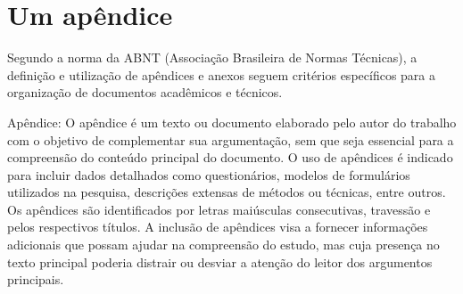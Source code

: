 
\chapter{Um apêndice}

    Segundo a norma da ABNT (Associação Brasileira de Normas Técnicas), a definição e utilização de apêndices e anexos seguem critérios específicos para a organização de documentos acadêmicos e técnicos.
    
    Apêndice: O apêndice é um texto ou documento elaborado pelo autor do trabalho com o objetivo de complementar sua argumentação, sem que seja essencial para a compreensão do conteúdo principal do documento. O uso de apêndices é indicado para incluir dados detalhados como questionários, modelos de formulários utilizados na pesquisa, descrições extensas de métodos ou técnicas, entre outros. Os apêndices são identificados por letras maiúsculas consecutivas, travessão e pelos respectivos títulos. A inclusão de apêndices visa a fornecer informações adicionais que possam ajudar na compreensão do estudo, mas cuja presença no texto principal poderia distrair ou desviar a atenção do leitor dos argumentos principais.